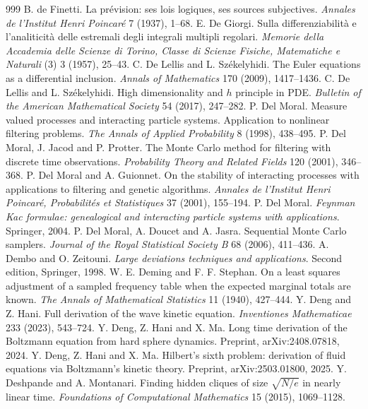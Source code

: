 \begin{thebibliography}{999}
 B. de Finetti. La pr\'evision: ses lois logiques, ses sources subjectives. \emph{Annales de l'Institut Henri Poincar\'e} 7 (1937), 1--68.
 E. De Giorgi. Sulla differenziabilit\`a e l'analiticit\`a delle estremali degli integrali multipli regolari. \emph{Memorie della Accademia delle Scienze di Torino, Classe di Scienze Fisiche, Matematiche e Naturali} (3) 3 (1957), 25--43.
 C. De Lellis and L. Sz\'ekelyhidi. The Euler equations as a differential inclusion. \emph{Annals of Mathematics} 170 (2009), 1417--1436.
 C. De Lellis and L. Sz\'ekelyhidi. High dimensionality and $h$ principle in PDE. \emph{Bulletin of the American Mathematical Society} 54 (2017), 247--282.
 P. Del Moral. Measure valued processes and interacting particle systems. Application to nonlinear filtering problems. \emph{The Annals of Applied Probability} 8 (1998), 438--495.
 P. Del Moral, J. Jacod and P. Protter. The Monte Carlo method for filtering with discrete time observations. \emph{Probability Theory and Related Fields} 120 (2001), 346--368.
 P. Del Moral and A. Guionnet. On the stability of interacting processes with applications to filtering and genetic algorithms. \emph{Annales de l'Institut Henri Poincar\'e, Probabilit\'es et Statistiques} 37 (2001), 155--194.
 P. Del Moral. \emph{Feynman Kac formulae: genealogical and interacting particle systems with applications}. Springer, 2004.
 P. Del Moral, A. Doucet and A. Jasra. Sequential Monte Carlo samplers. \emph{Journal of the Royal Statistical Society B} 68 (2006), 411--436.
 A. Dembo and O. Zeitouni. \emph{Large deviations techniques and applications}. Second edition, Springer, 1998.
 W. E. Deming and F. F. Stephan. On a least squares adjustment of a sampled frequency table when the expected marginal totals are known. \emph{The Annals of Mathematical Statistics} 11 (1940), 427--444.
 Y. Deng and Z. Hani. Full derivation of the wave kinetic equation. \emph{Inventiones Mathematicae} 233 (2023), 543--724.
 Y. Deng, Z. Hani and X. Ma. Long time derivation of the Boltzmann equation from hard sphere dynamics. Preprint, arXiv:2408.07818, 2024.
 Y. Deng, Z. Hani and X. Ma. Hilbert's sixth problem: derivation of fluid equations via Boltzmann's kinetic theory. Preprint, arXiv:2503.01800, 2025.
 Y. Deshpande and A. Montanari. Finding hidden cliques of size $\sqrt{N/e}$ in nearly linear time. \emph{Foundations of Computational Mathematics} 15 (2015), 1069--1128.

\end{thebibliography}
